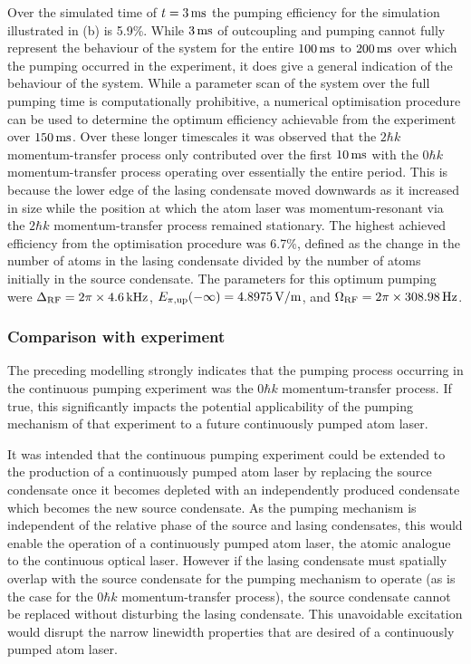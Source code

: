 Over the simulated time of $t = \unit[3]{ms}$ the pumping efficiency for the simulation illustrated in (b) is 5.9\%.  While $\unit[3]{ms}$ of outcoupling and pumping cannot fully represent the behaviour of the system for the entire $\unit[100]{ms}$ to $\unit[200]{ms}$ over which the pumping occurred in the experiment, it does give a general indication of the behaviour of the system.  While a parameter scan of the system over the full pumping time is computationally prohibitive, a numerical optimisation procedure can be used to determine the optimum efficiency achievable from the experiment over $\unit[150]{ms}$.  Over these longer timescales it was observed that the $2 \hbar k$ momentum-transfer process only contributed over the first $\unit[10]{ms}$ with the $0 \hbar k$ momentum-transfer process operating over essentially the entire period.  This is because the lower edge of the lasing condensate moved downwards as it increased in size while the position at which the atom laser was momentum-resonant via the $2 \hbar k$ momentum-transfer process remained stationary.  The highest achieved efficiency from the optimisation procedure was 6.7\%, defined as the change in the number of atoms in the lasing condensate divided by the number of atoms initially in the source condensate.  The parameters for this optimum pumping were $\Delta_\text{RF}= 2 \pi \times \unit[4.6]{kHz}$, $E_{\pi, \text{up}}(-\infty) = \unit[4.8975]{V/m}$, and $\Omega_\text{RF} = 2\pi \times \unit[308.98]{Hz}$.


\subsubsection{Comparison with experiment}

The preceding modelling strongly indicates that the pumping process occurring in the continuous pumping experiment was the $0 \hbar k$ momentum-transfer process.  If true, this significantly impacts the potential applicability of the pumping mechanism of that experiment to a future continuously pumped atom laser.  

It was intended that the continuous pumping experiment could be extended to the production of a continuously pumped atom laser by replacing the source condensate once it becomes depleted with an independently produced condensate which becomes the new source condensate.  As the pumping mechanism is independent of the relative phase of the source and lasing condensates, this would enable the operation of a continuously pumped atom laser, the atomic analogue to the continuous optical laser.  However if the lasing condensate must spatially overlap with the source condensate for the pumping mechanism to operate (as is the case for the $0 \hbar k$ momentum-transfer process), the source condensate cannot be replaced without disturbing the lasing condensate.  This unavoidable excitation would disrupt the narrow linewidth properties that are desired of a continuously pumped atom laser.

